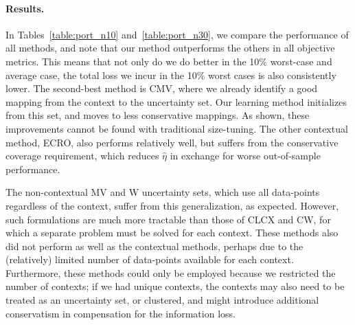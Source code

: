 \paragraph{Results.}
In Tables~\ref{table:port_n10} and~\ref{table:port_n30}, we compare the performance of all methods, and note that our method outperforms the others in all objective metrics. This means that not only do we do better in the 10\% worst-case and average case, the total loss we incur in the 10\% worst cases is also consistently lower.
The second-best method is CMV, where we already identify a good mapping from the context to the uncertainty set. Our learning method initializes from this set, and moves to less conservative mappings. As shown, these improvements cannot be found with traditional size-tuning. The other contextual method, ECRO, also performs relatively well, but suffers from the conservative coverage requirement, which reduces $\hat{\eta}$ in exchange for worse out-of-sample performance.


The non-contextual MV and W uncertainty sets, which use all data-points regardless of the context, suffer from this generalization, as expected. However, such formulations are much more tractable than those of CLCX and CW, for which a separate problem must be solved for each context.
These methods also did not perform as well as the contextual methods, perhaps due to the (relatively) limited number of data-points available for each context.
Furthermore, these methods could only be employed because we restricted the number of contexts; if we had unique contexts, the contexts may also need to be treated as an uncertainty set, or clustered, and might introduce additional conservatism in compensation for the information loss.

